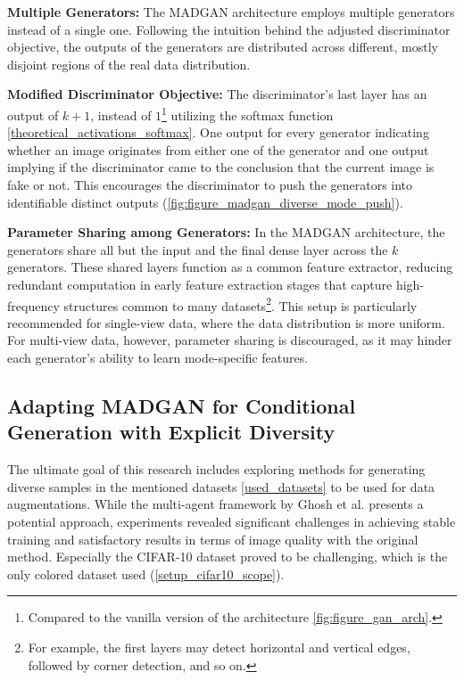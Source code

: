 \noindent\textbf{Multiple Generators:} The MADGAN architecture employs multiple generators instead of a single one. Following the intuition behind the adjusted discriminator objective, the outputs of the generators are distributed across different, mostly disjoint regions of the real data distribution.

\noindent\textbf{Modified Discriminator Objective:} The discriminator's last layer has an output of \(k + 1\), instead of \(1\)\footnote{Compared to the vanilla version of the architecture \ref{fig:figure_gan_arch}.} utilizing the softmax function \ref{theoretical_activations_softmax}. One output for every generator indicating whether an image originates from either one of the generator and one output implying if the discriminator came to the conclusion that the current image is fake or not. This encourages the discriminator to push the generators into identifiable distinct outputs (\ref{fig:figure_madgan_diverse_mode_push}).

\noindent\textbf{Parameter Sharing among Generators:} In the MADGAN architecture, the generators share all but the input and the final dense layer across the \(k\) generators. These shared layers function as a common feature extractor, reducing redundant computation in early feature extraction stages that capture high-frequency structures common to many datasets\footnote{For example, the first layers may detect horizontal and vertical edges, followed by corner detection, and so on.}. This setup is particularly recommended for single-view data, where the data distribution is more uniform. For multi-view data, however, parameter sharing is discouraged, as it may hinder each generator’s ability to learn mode-specific features.


\newcommand{\definegenerator}{\texttt{define\_generator}}
\newcommand{\definediscriminator}{\texttt{define\_discriminator}}
\newcommand{\lambdadiv}{\lambda_{\text{div}}}
\subsection[Adapting MADGAN for Conditional Generation with Diversity - cMADGAN]{Adapting MADGAN for Conditional Generation with Explicit Diversity}
\label{theoretical_cmadgan}

The ultimate goal of this research includes exploring methods for generating diverse samples in the mentioned datasets \ref{used_datasets} to be used for data augmentations. While the multi-agent framework by Ghosh et al. presents a potential approach, experiments revealed significant challenges in achieving stable training and satisfactory results in terms of image quality with the original method. Especially the CIFAR-10 dataset proved to be challenging, which is the only colored dataset used (\ref{setup_cifar10_scope}).


